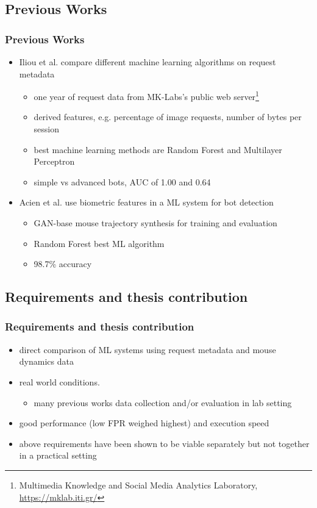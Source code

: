 \documentclass[t,aspectratio=169,table]{beamer}
\begin{document}
\subsection{Previous Works}
\begin{frame}
\frametitle{Previous Works}

\begin{itemize}
    \item Iliou et al. \cite{10.1145/3339252.3339267} compare different machine learning algorithms on request metadata
    \begin{itemize}
        \item one year of request data from MK-Labs's public web server\footnote{Multimedia Knowledge and Social Media Analytics Laboratory, \url{https://mklab.iti.gr/}}
        \item derived features, e.g. percentage of image requests, number of bytes per session
        \item best machine learning methods are Random Forest and Multilayer Perceptron
        \item simple vs advanced bots, AUC of 1.00 and 0.64
    \end{itemize}
    \item Acien et al. \cite{Acien2020BeCAPTCHAMouseSM} use biometric features in a ML system for bot detection
    \begin{itemize}
        \item GAN-base mouse trajectory synthesis for training and evaluation
        \item Random Forest best ML algorithm
        \item 98.7\% accuracy
    \end{itemize}
\end{itemize}

\end{frame}

\subsection{Requirements and thesis contribution}
\begin{frame}
\frametitle{Requirements and thesis contribution}

\begin{itemize}
    \item direct comparison of ML systems using request metadata and mouse dynamics data
    \item real world conditions.
    \begin{itemize}
        \item many previous works data collection and/or evaluation in lab setting
    \end{itemize}
    \item good performance (low FPR weighed highest) and execution speed
    \item above requirements have been shown to be viable separately but not together in a practical setting
\end{itemize}

\end{frame}
\end{document}
